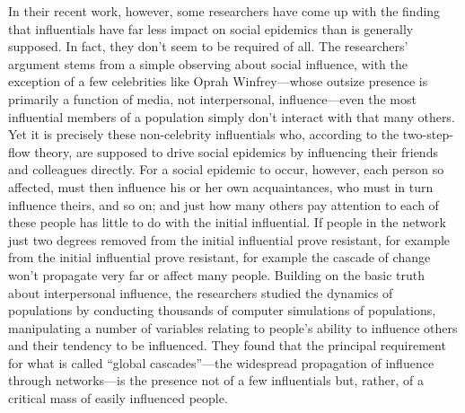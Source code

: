 In their recent work, however, some researchers have come up with the finding that influentials have far less impact on social epidemics than is generally supposed. In fact, they don't seem to be required of all.
The researchers' argument stems from a simple observing about social influence, with the exception of a few celebrities like Oprah Winfrey—whose outsize presence is primarily a function of media, not interpersonal, influence—even the most influential members of a population simply don't interact with that many others. Yet it is precisely these non-celebrity influentials who, according to the two-step-flow theory, are supposed to drive social epidemics by influencing their friends and colleagues directly. For a social epidemic to occur, however, each person so affected, must then influence his or her own acquaintances, who must in turn influence theirs, and so on; and just how many others pay attention to each of these people has little to do with the initial influential. If people in the network just two degrees removed from the initial influential prove resistant, for example from the initial influential prove resistant, for example the cascade of change won't propagate very far or affect many people.
Building on the basic truth about interpersonal influence, the researchers studied the dynamics of populations by conducting thousands of computer simulations of populations, manipulating a number of variables relating to people’s ability to influence others and their tendency to be influenced. They found that the principal requirement for what is called “global cascades”—the widespread propagation of influence through networks—is the presence not of a few influentials but, rather, of a critical mass of easily influenced people.
